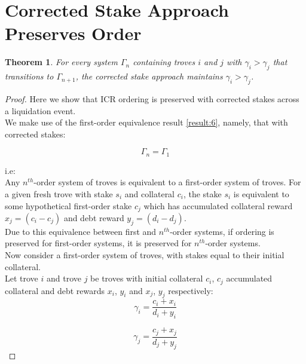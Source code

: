 \documentclass[reqno]{article}
\newtheorem{theorem}{Theorem}[section]
\begin{document}
\section{Corrected Stake Approach Preserves Order}

\begin{theorem} \label{result:8}
  For every system $\Gamma_n$ containing troves $i$ and $j$ with $\gamma_i > \gamma_j$ that transitions to $\Gamma_{n+1}$, the corrected stake approach maintains $\gamma_i > \gamma_j$.
\end{theorem}

\begin{proof}
Here we show that ICR ordering is preserved with corrected stakes across a liquidation event.\\

We make use of the first-order equivalence result \ref{result:6}, namely, that with corrected stakes:

\begin{equation} 
    \Gamma_n = \Gamma_1
\end{equation}

i.e:\\

Any $n^{th}$-order system of troves is equivalent to a first-order system of troves. For a given fresh trove with stake $s_i$ and collateral $c_i$, the stake $s_i$ is equivalent to some hypothetical first-order stake $c_j$ which has accumulated collateral reward $x_j = (c_i - c_j)$ and debt reward $y_j = (d_i - d_j)$.\\

Due to this equivalence between first and $n^{th}$-order systems, if ordering is preserved for first-order systems, it is preserved for $n^{th}$-order systems.\\

Now consider a first-order system of troves, with stakes equal to their initial collateral.\\

Let trove $i$ and trove $j$ be troves with initial collateral $c_i$, $c_j$ accumulated collateral and debt rewards $x_i$, $y_i$ and $x_j$, $y_j$ respectively:\\

\begin{equation} 
    \gamma_i=\frac{c_i+x_i}{d_i+y_i}
\end{equation}

\begin{equation} 
    \gamma_j=\frac{c_j+x_j}{d_j+y_j}
\end{equation}


\end{proof}
\end{document}
